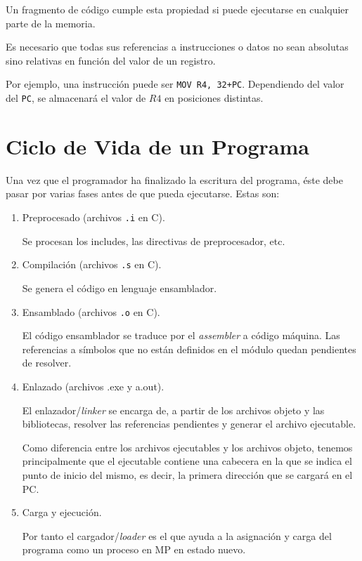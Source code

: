 \begin{definicion}

Un fragmento de código cumple esta propiedad si puede ejecutarse en cualquier parte de la memoria.

Es necesario que todas sus referencias a instrucciones o datos no sean absolutas sino relativas en función del valor de un registro.

Por ejemplo, una instrucción puede ser \verb|MOV R4, 32+PC|. Dependiendo del valor del \verb|PC|, se almacenará el valor de $R4$ en posiciones distintas.
\end{definicion}



\section{Ciclo de Vida de un Programa}

Una vez que el programador ha finalizado la escritura del programa, éste debe pasar por varias fases antes de que pueda ejecutarse. Estas son:
\begin{enumerate}
    \item Preprocesado (archivos \verb|.i| en C).

    Se procesan los includes, las directivas de preprocesador, etc.

    \item Compilación (archivos \verb|.s| en C).

    Se genera el código en lenguaje ensamblador.

    \item Ensamblado (archivos \verb|.o| en C).

    El código ensamblador se traduce por el \textit{assembler} a código máquina. Las referencias a símbolos que no están definidos en el módulo quedan pendientes de resolver.

    \item Enlazado (archivos .exe y a.out).

    El enlazador/\textit{linker} se encarga de, a partir de los archivos objeto y las bibliotecas, resolver las referencias pendientes y generar el archivo ejecutable.

    Como diferencia entre los archivos ejecutables y los archivos objeto, tenemos principalmente que el ejecutable contiene una cabecera en la que se indica el punto de inicio del mismo, es decir, la primera dirección que se cargará en el PC.

    \item Carga y ejecución.

    Por tanto el cargador/\textit{loader} es el que ayuda a la asignación y carga del programa como un proceso en MP en estado nuevo.
\end{enumerate}


